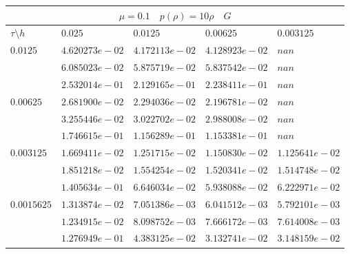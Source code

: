 \documentclass[a4paper,12pt]{extarticle}
\begin{document}
\begin{tabular}{|l|l|l|l|l|}
	\hline
	\multicolumn{5}{|c|}{$\mu =0.1 \quad  p(\rho) =10 \rho \quad G$}\\
	\hline
	$\tau\setminus h$ & $0.025$ & $0.0125$ & $0.00625$ & $0.003125$\\
	\hline
	$0.0125$  & $4.620273e-02$ & $4.172113e-02$ & $4.128923e-02$ & $nan$\\
	& $6.085023e-02$ & $5.875719e-02$ & $5.837542e-02$ & $nan$\\
	& $2.532014e-01$ & $2.129165e-01$ & $2.238411e-01$ & $nan$\\
	\hline
	$0.00625$  & $2.681900e-02$ & $2.294036e-02$ & $2.196781e-02$ & $nan$\\
	& $3.255446e-02$ & $3.022702e-02$ & $2.988008e-02$ & $nan$\\
	& $1.746615e-01$ & $1.156289e-01$ & $1.153381e-01$ & $nan$\\
	\hline
	$0.003125$  & $1.669411e-02$ & $1.251715e-02$ & $1.150830e-02$ & $1.125641e-02$\\
	& $1.851218e-02$ & $1.554254e-02$ & $1.520341e-02$ & $1.514748e-02$\\
	& $1.405634e-01$ & $6.646034e-02$ & $5.938088e-02$ & $6.222971e-02$\\
	\hline
	$0.0015625$  & $1.313874e-02$ & $7.051386e-03$ & $6.041512e-03$ & $5.792101e-03$\\
	& $1.234915e-02$ & $8.098752e-03$ & $7.666172e-03$ & $7.614008e-03$\\
	& $1.276949e-01$ & $4.383125e-02$ & $3.132741e-02$ & $3.148159e-02$\\
	\hline
\end{tabular}
\end{document}
